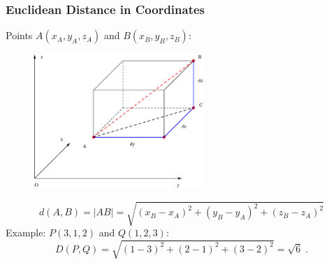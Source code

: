 \begin{frame}[label=current]
 \frametitle{Euclidean Distance in Coordinates}

   Points $A(x_A,y_A,z_A)$ and $B(x_B,y_B,z_B)$:
\begin{figure}[h]
  \includegraphics[height=2in]{../../modules/coordinate-systems/pictures/euclidean_distance.eps}
\end{figure}
%
$$d(A,B) = |AB| = \sqrt{(x_B-x_A)^2+(y_B-y_A)^2+(z_B-z_A)^2}$$
%
Example: $P(3,1,2)$ and $Q(1,2,3)$:\pause
%
$$D(P,Q) = \sqrt{(1-3)^2+(2-1)^2+(3-2)^2} = \sqrt{6}\; .$$

\end{frame}